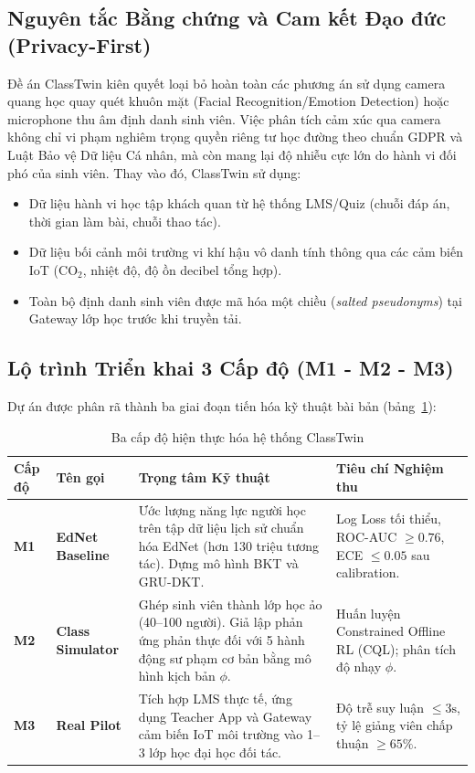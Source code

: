 \subsection{Nguyên tắc Bằng chứng và Cam kết Đạo đức (Privacy-First)}\label{subsec:privacy-first}
\begin{alertbox}
Đề án ClassTwin kiên quyết loại bỏ hoàn toàn các phương án sử dụng camera quang học quay quét khuôn mặt (Facial Recognition/Emotion Detection) hoặc microphone thu âm định danh sinh viên. Việc phân tích cảm xúc qua camera không chỉ vi phạm nghiêm trọng quyền riêng tư học đường theo chuẩn GDPR và Luật Bảo vệ Dữ liệu Cá nhân, mà còn mang lại độ nhiễu cực lớn do hành vi đối phó của sinh viên.
Thay vào đó, ClassTwin sử dụng:
\begin{itemize}
  \item Dữ liệu hành vi học tập khách quan từ hệ thống LMS/Quiz (chuỗi đáp án, thời gian làm bài, chuỗi thao tác).
  \item Dữ liệu bối cảnh môi trường vi khí hậu vô danh tính thông qua các cảm biến IoT ($\text{CO}_2$, nhiệt độ, độ ồn decibel tổng hợp).
  \item Toàn bộ định danh sinh viên được mã hóa một chiều (\textit{salted pseudonyms}) tại Gateway lớp học trước khi truyền tải.
\end{itemize}
\end{alertbox}

\subsection{Lộ trình Triển khai 3 Cấp độ (M1 - M2 - M3)}\label{subsec:ba-cap-do}
Dự án được phân rã thành ba giai đoạn tiến hóa kỹ thuật bài bản (bảng~\ref{tab:levels-m1-m3}):
\begin{table}[htbp]
  \centering\small
  \caption{Ba cấp độ hiện thực hóa hệ thống ClassTwin}\label{tab:levels-m1-m3}
  \begin{tabularx}{\textwidth}{l p{3.2cm} X p{3.5cm}}
    \toprule
    \textbf{Cấp độ} & \textbf{Tên gọi} & \textbf{Trọng tâm Kỹ thuật} & \textbf{Tiêu chí Nghiệm thu} \\
    \midrule
    \textbf{M1} & \textbf{EdNet Baseline} & Ước lượng năng lực người học trên tập dữ liệu lịch sử chuẩn hóa EdNet (hơn 130 triệu tương tác). Dựng mô hình BKT và GRU-DKT. & Log Loss tối thiểu, ROC-AUC $\ge 0.76$, ECE $\le 0.05$ sau calibration. \\
    \addlinespace
    \textbf{M2} & \textbf{Class Simulator} & Ghép sinh viên thành lớp học ảo (40--100 người). Giả lập phản ứng phản thực đối với 5 hành động sư phạm cơ bản bằng mô hình kịch bản $\phi$. & Huấn luyện Constrained Offline RL (CQL); phân tích độ nhạy $\phi$. \\
    \addlinespace
    \textbf{M3} & \textbf{Real Pilot} & Tích hợp LMS thực tế, ứng dụng Teacher App và Gateway cảm biến IoT môi trường vào 1--3 lớp học đại học đối tác. & Độ trễ suy luận $\le 3\text{s}$, tỷ lệ giảng viên chấp thuận $\ge 65\%$. \\
    \bottomrule
  \end{tabularx}
\end{table}

\newpage

